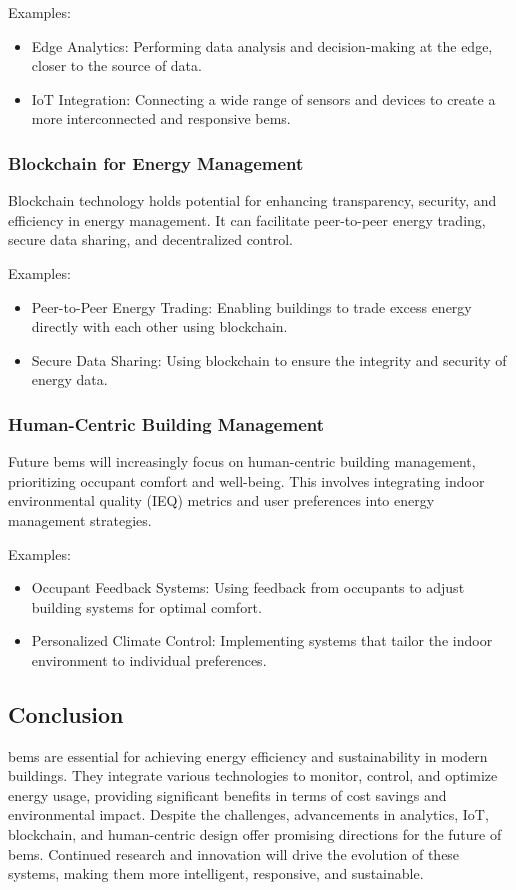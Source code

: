 Examples:
\begin{itemize}
    \item Edge Analytics: Performing data analysis and decision-making at the edge, closer to the source of data.
    \item IoT Integration: Connecting a wide range of sensors and devices to create a more interconnected and responsive \gls{bems}.
\end{itemize}

\subsubsection*{Blockchain for Energy Management}

Blockchain technology holds potential for enhancing transparency, security, and efficiency in energy management. It can facilitate peer-to-peer energy trading, secure data sharing, and decentralized control.

Examples:
\begin{itemize}
    \item Peer-to-Peer Energy Trading: Enabling buildings to trade excess energy directly with each other using blockchain.
    \item Secure Data Sharing: Using blockchain to ensure the integrity and security of energy data.
\end{itemize}

\subsubsection*{Human-Centric Building Management}

Future \gls{bems} will increasingly focus on human-centric building management, prioritizing occupant comfort and well-being. This involves integrating indoor environmental quality (IEQ) metrics and user preferences into energy management strategies.

Examples:
\begin{itemize}
    \item Occupant Feedback Systems: Using feedback from occupants to adjust building systems for optimal comfort.
    \item Personalized Climate Control: Implementing systems that tailor the indoor environment to individual preferences.
\end{itemize}

\subsection*{Conclusion}
\acrlong{bems} are essential for achieving energy efficiency and sustainability in modern buildings. They integrate various technologies to monitor, control, and optimize energy usage, providing significant benefits in terms of cost savings and environmental impact. Despite the challenges, advancements in analytics, IoT, blockchain, and human-centric design offer promising directions for the future of \gls{bems}. Continued research and innovation will drive the evolution of these systems, making them more intelligent, responsive, and sustainable.